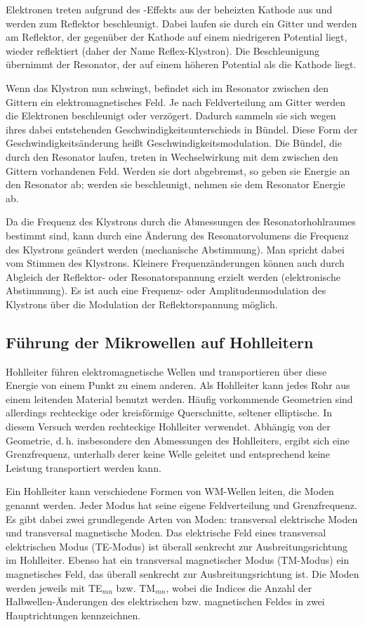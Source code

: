 Elektronen treten aufgrund des -Effekts aus der beheizten
Kathode aus und werden zum Reflektor beschleunigt. Dabei laufen sie
durch ein Gitter und werden am Reflektor, der gegenüber der Kathode auf
einem niedrigeren Potential liegt, wieder reflektiert (daher der Name
Reflex-Klystron).  Die Beschleunigung übernimmt der Resonator, der auf
einem höheren Potential als die Kathode liegt.

Wenn das Klystron nun schwingt, befindet sich im Resonator zwischen den
Gittern ein elektromagnetisches Feld.  Je nach Feldverteilung am Gitter
werden die Elektronen beschleunigt oder verzögert.  Dadurch sammeln sie
sich wegen ihres dabei entstehenden Geschwindigkeitsunterschieds in
Bündel.  Diese Form der Geschwindigkeitsänderung heißt
Geschwindigkeitsmodulation.  Die Bündel, die durch den Resonator laufen,
treten in Wechselwirkung mit dem zwischen den Gittern vorhandenen Feld.
Werden sie dort abgebremst, so geben sie Energie an den Resonator ab;
werden sie beschleunigt, nehmen sie dem Resonator Energie ab.

Da die Frequenz des Klystrons durch die Abmessungen des
Resonatorhohlraumes bestimmt sind, kann durch eine Änderung des
Resonatorvolumens die Frequenz des Klystrons geändert werden
(mechanische Abstimmung).  Man spricht dabei vom Stimmen des Klystrons.
Kleinere Frequenzänderungen können auch durch Abgleich der Reflektor-
oder Resonatorspannung erzielt werden (elektronische Abstimmung).  Es
ist auch eine Frequenz- oder Amplitudenmodulation des Klystrons über die
Modulation der Reflektorspannung möglich.


\subsection{Führung der Mikrowellen auf Hohlleitern}

Hohlleiter führen elektromagnetische Wellen und transportieren über
diese Energie von einem Punkt zu einem anderen.  Als Hohlleiter kann
jedes Rohr aus einem leitenden Material benutzt werden.  Häufig
vorkommende Geometrien sind allerdings rechteckige oder kreisförmige
Querschnitte, seltener elliptische.  In diesem Versuch werden
rechteckige Hohlleiter verwendet.  Abhängig von der Geometrie,
d.\,h. insbesondere den Abmessungen des Hohlleiters, ergibt sich eine
Grenzfrequenz, unterhalb derer keine Welle geleitet und entsprechend
keine Leistung transportiert werden kann.

Ein Hohlleiter kann verschiedene Formen von WM-Wellen leiten, die Moden
genannt werden. Jeder Modus hat seine eigene Feldverteilung und
Grenzfrequenz. Es gibt dabei zwei grundlegende Arten von Moden:
transversal elektrische Moden und transversal magnetische Moden.  Das
elektrische Feld eines transversal elektrischen Modus (TE-Modus) ist
überall senkrecht zur Ausbreitungsrichtung im Hohlleiter.  Ebenso hat
ein transversal magnetischer Modus (TM-Modus) ein magnetisches Feld, das
überall senkrecht zur Ausbreitungsrichtung ist.  Die Moden werden
jeweils mit TE$_{mn}$ bzw. TM$_{mn}$, wobei die Indices die Anzahl der
Halbwellen-Änderungen des elektrischen bzw. magnetischen Feldes in zwei
Hauptrichtungen kennzeichnen.

